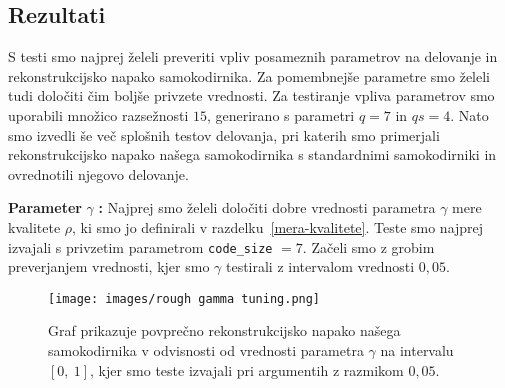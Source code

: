 \documentclass[12pt,a4paper,twoside]{article}
\theoremstyle{definition} %
\theoremstyle{plain} %
\numberwithin{equation}{section}  %
\begin{document}
\subsection{Rezultati}
\label{pogl:rezultati}



S testi smo najprej želeli preveriti vpliv posameznih parametrov na delovanje in rekonstrukcijsko napako samokodirnika.
Za pomembnejše parametre smo želeli tudi določiti čim boljše privzete vrednosti.
Za testiranje vpliva parametrov smo uporabili množico razsežnosti $15$, generirano s parametri $q=7$ in $qs=4$. %
Nato smo izvedli še več splošnih testov delovanja, pri katerih smo primerjali rekonstrukcijsko napako našega samokodirnika s standardnimi samokodirniki in ovrednotili njegovo delovanje.





\textbf{Parameter} $\gamma$ \textbf{:} Najprej smo želeli določiti dobre vrednosti parametra $\gamma$ mere kvalitete $\rho$, ki smo jo definirali v razdelku~\ref{mera-kvalitete}.
Teste smo najprej izvajali s privzetim parametrom \texttt{code\_size} $= 7$. %
Začeli smo z grobim preverjanjem vrednosti, kjer smo $\gamma$ testirali z intervalom vrednosti $0,05$.

\begin{figure}[h]
	\centering
	\texttt{[image: images/rough gamma tuning.png]}
	\caption[Pregled rekonstrukcijske napake glede na $\gamma$.]{Graf prikazuje povprečno rekonstrukcijsko napako našega 
	samokodirnika v odvisnosti od vrednosti parametra $\gamma$ na intervalu $[0,\ 1]$, kjer smo teste izvajali pri argumentih z razmikom $0,05$. }
	\label{fig:gamma_rough}
\end{figure}
\end{document}
